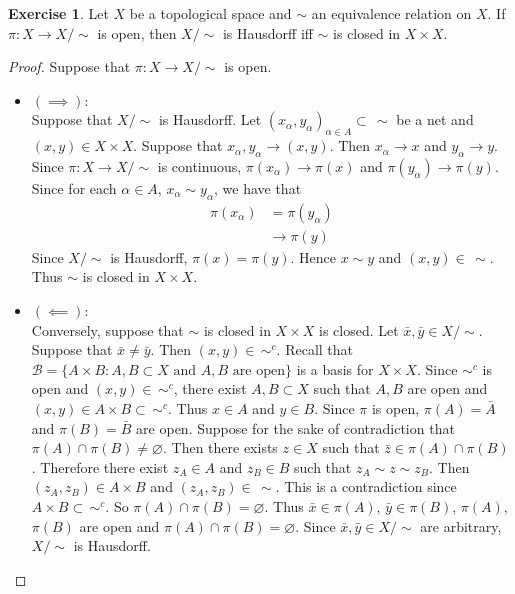 \documentclass[12pt]{amsart}
\theoremstyle{definition}
\newtheorem{ex}[definition]{Exercise}
\newcommand{\al}{\alpha}
\newcommand{\MB}{\mathcal{B}}
\DeclareMathOperator*{\0}{\mbf{0}}
\DeclareMathOperator*{\1}{\mbf{1}}
\begin{document}
	\begin{ex}
		Let $X$ be a topological space and $\sim$ an equivalence relation on $X$. If $\pi: X \rightarrow X / \sim$ is open, then $X / \sim$ is Hausdorff iff $\sim$ is closed in $X \times X$.
	\end{ex}
	
	\begin{proof}
		Suppose that $\pi:X \rightarrow X / \sim$ is open. 
		\begin{itemize}
			\item $(\implies)$: \\
			Suppose that $X/\sim$ is Hausdorff. Let $(x_{\al}, y_{\al})_{\al \in A} \subset \, \sim$ be a net and $(x,y) \in X \times X$. Suppose that $x_{\al}, y_{\al} \rightarrow (x,y)$. Then $x_{\al} \rightarrow x$ and $y_{\al} \rightarrow y$. Since $\pi:X \rightarrow X / \sim$ is continuous, $\pi(x_{\al}) \rightarrow \pi(x)$ and $\pi(y_{\al}) \rightarrow \pi(y)$. Since for each $\al \in A$, $x_{\al} \sim y_{\al}$, we have that 
			\begin{align*}
				\pi(x_{\al}) 
				& = \pi(y_{\al})\\
				& \rightarrow \pi(y)
			\end{align*}
			Since $X/ \sim$ is Hausdorff, $\pi(x) = \pi(y)$. Hence $x \sim y$ and $(x,y) \in \, \sim$. Thus $\sim$ is closed in $X \times X$.\\
			\item $(\impliedby)$: \\
			Conversely, suppose that $\sim$ is closed in $X \times X$ is closed. Let $\bar{x}, \bar{y} \in X / \sim$. Suppose that $\bar{x} \neq \bar{y}$. Then $(x,y) \in \, \sim^c$. Recall that $\MB =\{A \times B: A,B \subset X \text{ and $A, B$ are open} \}$ is a basis for $X \times X$. Since  $\sim^c$ is open and $(x,y) \in \, \sim^c$, there exist $A,B \subset X$ such that $A,B$ are open and $(x,y) \in A \times B \subset \, \sim^c$. Thus $x \in A$ and $y \in B$. Since $\pi$ is open, $\pi(A) = \bar{A}$ and $\pi(B) = \bar{B}$ are open. Suppose for the sake of contradiction that $\pi(A) \cap \pi(B) \neq \varnothing$. Then there exists $z \in X$ such that $\bar{z} \in \pi(A) \cap \pi(B)$. Therefore there exist $z_A \in A$ and $z_B \in B$ such that $z_A \sim z \sim z_B$. Then $(z_A, z_B) \in A \times B$ and $(z_A, z_B) \in \, \sim$. This is a contradiction since $A \times B \subset \, \sim^c$. So $\pi(A) \cap \pi(B) = \varnothing$. Thus $\bar{x} \in \pi(A)$, $\bar{y} \in \pi(B)$, $\pi(A)$, $\pi(B)$ are open and $\pi(A) \cap \pi(B) = \varnothing$. Since $\bar{x}, \bar{y} \in X / \sim$ are arbitrary, $X / \sim$ is Hausdorff.
		\end{itemize}
	\end{proof}
\end{document}
